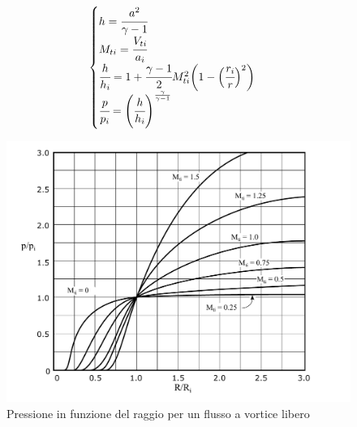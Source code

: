 \begin{align*}
\begin{cases}
h = \cfrac{a ^ 2}{\gamma - 1} \\
M_{ti} = \cfrac{V_{ti}}{a_i}\\
\cfrac{h}{h_i} = 1 + \cfrac{\gamma -1}{2} M_{ti}^2 \bigg(1 -  \Big( \cfrac{r_i}{r}\Big)^2 \bigg)\\
\cfrac{p}{p_i} = \left( \cfrac{h}{h_i} \right)^{\frac{\gamma}{\gamma - 1}}
\end{cases}
\end{align*}
\begin{figure}
\centering
  \includegraphics[width=.8\textwidth]{fig/VorticeLibero.pdf}
\caption{Pressione in funzione del raggio per un flusso a vortice libero}
\label{fig:VorticeLibero}
\end{figure}
